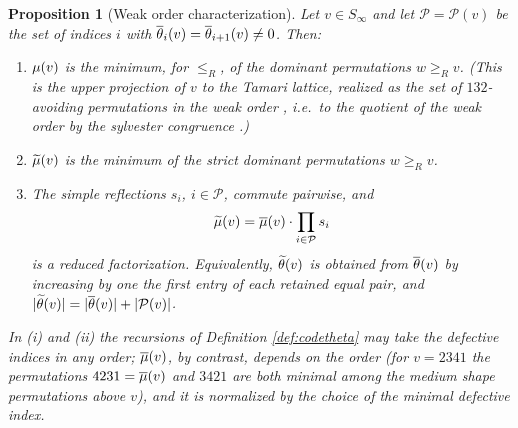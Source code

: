 \documentclass{amsart}
\newtheorem{proposition}[lemma]{Proposition}
\theoremstyle{definition}
\theoremstyle{remark}
\numberwithin{equation}{section}
\begin{document}
\begin{proposition}[Weak order characterization] \label{prop:weakorder}
Let $v\in S_\infty$ and let $\mathcal P=\mathcal P(v)$ be the set of indices $i$ with $\overline{\theta}_i(v)=\overline{\theta}_{i+1}(v)\neq0$. Then:
\begin{enumerate}
\item[(i)] $\mu(v)$ is the minimum, for $\leq_R$, of the dominant permutations $w\geq_Rv$. (This is the upper projection of $v$ to the Tamari lattice, realized as the set of $132$-avoiding permutations in the weak order \cite{bjorner1997shellable}, i.e.\ to the quotient of the weak order by the sylvester congruence \cite{reading2004congruences,reading2006cambrian}.)
\item[(ii)] $\widetilde{\mu}(v)$ is the minimum of the strict dominant permutations $w\geq_Rv$.
\item[(iii)] The simple reflections $s_i$, $i\in\mathcal P$, commute pairwise, and
$$\widetilde{\mu}(v)=\overline{\mu}(v)\cdot\prod_{i\in\mathcal P}s_i$$
is a reduced factorization. Equivalently, $\widetilde{\theta}(v)$ is obtained from $\overline{\theta}(v)$ by increasing by one the first entry of each retained equal pair, and $|\widetilde{\theta}(v)|=|\overline{\theta}(v)|+|\mathcal P(v)|$.
\end{enumerate}
In (i) and (ii) the recursions of Definition \ref{def:codetheta} may take the defective indices in any order; $\overline{\mu}(v)$, by contrast, depends on the order (for $v=2341$ the permutations $4231=\overline{\mu}(v)$ and $3421$ are both minimal among the medium shape permutations above $v$), and it is normalized by the choice of the minimal defective index.
\end{proposition}
\end{document}
